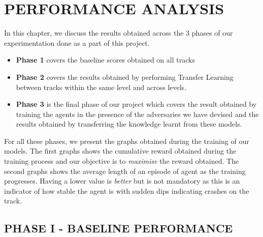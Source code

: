 
\chapter{PERFORMANCE ANALYSIS}

In this chapter, we discuss the results obtained across the 3 phases
of our experimentation done as a part of this project.
\begin{itemize}
\item \textbf{Phase 1} covers the baseline scores obtained on all
  tracks
\item \textbf{Phase 2} covers the results obtained by performing
  Transfer Learning between tracks within the same level and across
  levels.
\item \textbf{Phase 3} is the final phase of our project which covers
  the result obtained by training the agents in the presence of the
  adversaries we have devised and the results obtained by transferring
  the knowledge learnt from these models.
\end{itemize}

For all these phases, we present the graphs obtained during the
training of our models. The first graphs shows the cumulative reward
obtained during the training process and our objective is to
\textit{maximise} the reward obtained. The second graphs shows the
average length of an episode of agent as the training
progresses. Having a lower value is \textit{better} but is not
mandatory as this is an indicator of how stable the agent is with
sudden dips indicating crashes on the track.

\section{PHASE I - BASELINE PERFORMANCE}
